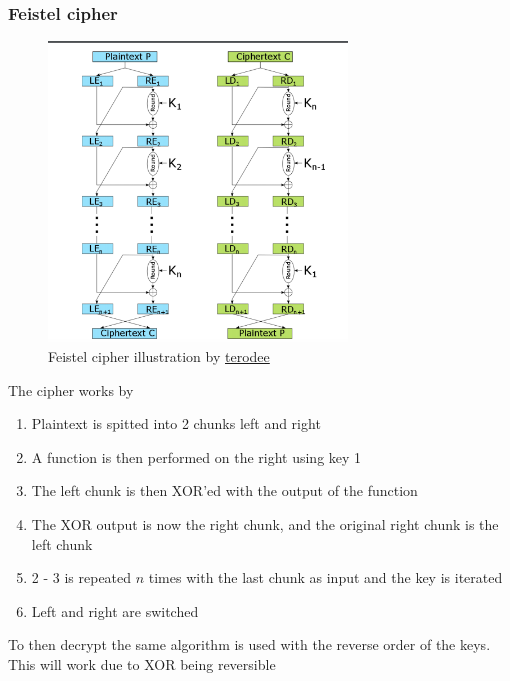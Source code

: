 \documentclass[12pt, a4paper]{article}
\begin{document}
			\subsubsection{Feistel cipher}
				\begin{figure}[h!]
					\includegraphics[width=300px]{assets/feistelCipher.png}
					\centering
					\caption{Feistel cipher illustration by \href{https://crypto.stackexchange.com/questions/67717/learning-about-feistel-cipher}{terodee}}
				\end{figure}
				The cipher works by
				\begin{enumerate}
					\item Plaintext is spitted into 2 chunks left and right
					\item A function is then performed on the right using key 1
					\item The left chunk is then XOR'ed with the output of the function
					\item The XOR output is now the right chunk, and the original right chunk is the left chunk
					\item 2 - 3 is repeated $n$ times with the last chunk as input and the key is iterated
					\item Left and right are switched
				\end{enumerate}
				To then decrypt the same algorithm is used with the reverse order of the keys.\\
				This will work due to XOR being reversible
\end{document}
